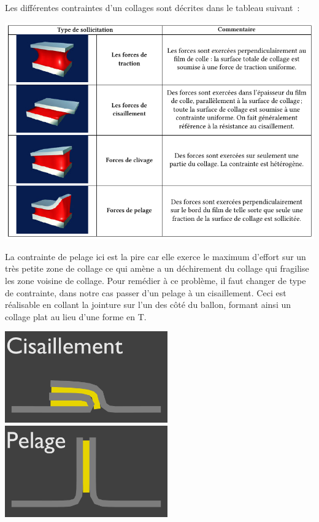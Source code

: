 \documentclass[a4paper,11pt]{article}
\begin{document}
Les différentes contraintes d'un collages sont décrites dans le tableau suivant~:
\begin{center}
 \includegraphics[width=15cm]{../Images/colle_contraintes.png}
\end{center}

La contrainte de pelage ici est la pire car elle exerce le maximum d'effort sur un très petite zone de collage ce qui amène a un déchirement du collage qui fragilise les zone voisine de collage. Pour remédier à ce problème, il faut changer de type de contrainte, dans notre cas passer d'un pelage à un cisaillement. Ceci est réalisable en collant la jointure sur l'un des côté du ballon, formant ainsi un collage plat au lieu d'une forme en T.

\begin{center}
 \includegraphics[width=7cm]{../Images/colle_cisaillement.png}
 \includegraphics[width=7cm]{../Images/colle_pelage.png}
\end{center}
\end{document}
